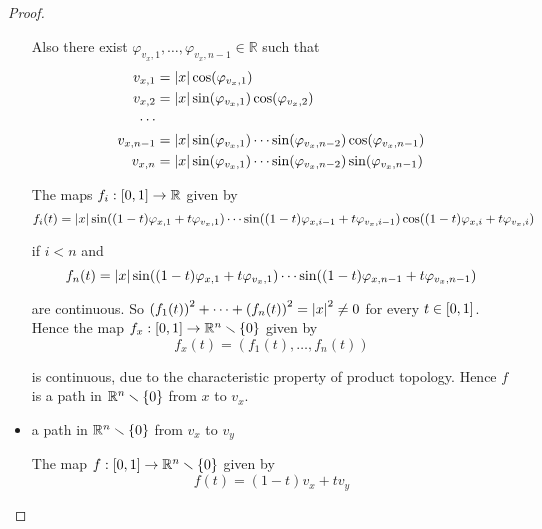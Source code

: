 \begin{proof}
\begin{itemize}
		      Also there exist $\varphi_{v_{x},1}, \ldots, \varphi_{v_{x},n-1} \in \mathbb{R}$ such that
		      \begin{align*}
			      v_{x,1}   & = \left\vert{x}\right\vert\cos(\varphi_{v_{x},1})                                                         \\
			      v_{x,2}   & = \left\vert{x}\right\vert\sin(\varphi_{v_{x},1})\cos(\varphi_{v_{x},2})                                  \\
			      \cdots    &                                                                                          \\
			      v_{x,n-1} & = \left\vert{x}\right\vert\sin(\varphi_{v_{x},1})\cdots\sin(\varphi_{v_{x},n-2})\cos(\varphi_{v_{x},n-1}) \\
			      v_{x,n}   & = \left\vert{x}\right\vert\sin(\varphi_{v_{x},1})\cdots\sin(\varphi_{v_{x},n-2})\sin(\varphi_{v_{x},n-1})
		      \end{align*}

		      The maps $f_{i}: \left[{0, 1}\right] \to \mathbb{R}$ given by
		      \begin{equation*}
			      f_{i}(t) = \left\vert{x}\right\vert\sin((1-t)\varphi_{x,1} + t\varphi_{v_{x},1})\cdots \sin((1-t)\varphi_{x,i-1} + t\varphi_{v_{x},i-1})\cos((1-t)\varphi_{x,i} + t\varphi_{v_{x},i})
		      \end{equation*}

		      if $i < n$ and
		      \begin{equation*}
			      f_{n}(t) = \left\vert{x}\right\vert\sin((1-t)\varphi_{x,1} + t\varphi_{v_{x},1})\cdots \sin((1-t)\varphi_{x,n-1} + t\varphi_{v_{x},n-1})
		      \end{equation*}

		      are continuous. So ${(f_{1}(t))}^{2} + \cdots + {(f_{n}(t))}^{2} = \left\vert{x}\right\vert^{2} \ne 0$ for every $t\in \left[{0,1}\right]$. Hence the map $f_{x}: \left[{0, 1}\right] \to \mathbb{R}^{n}\smallsetminus\left\{{0}\right\}$ given by
		      \begin{equation*}
			      f_{x}(t) = (f_{1}(t), \ldots, f_{n}(t))
		      \end{equation*}

		      is continuous, due to the characteristic property of product topology. Hence $f$ is a path in $\mathbb{R}^{n}\smallsetminus\left\{{0}\right\}$ from $x$ to $v_{x}$.
		\item a path in $\mathbb{R}^{n}\smallsetminus\left\{{0}\right\}$ from $v_{x}$ to $v_{y}$

		      The map $f: \left[{0, 1}\right] \to \mathbb{R}^{n}\smallsetminus\left\{{0}\right\}$ given by
		      \begin{equation*}
			      f(t) = (1 - t)v_{x} + tv_{y}
		      \end{equation*}


\end{itemize}
\end{proof}

